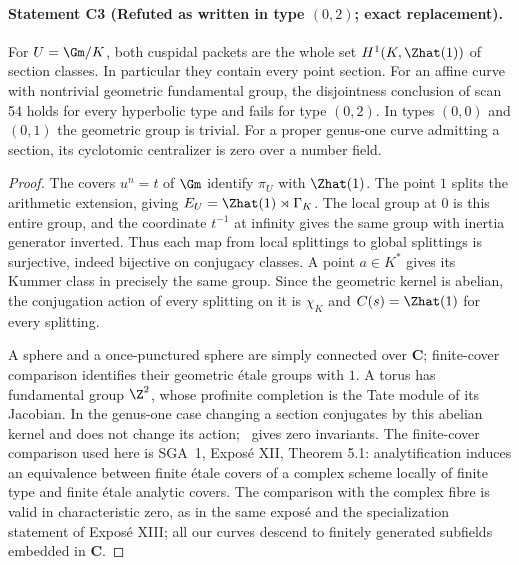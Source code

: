 \paragraph{Statement C3 (Refuted as written in type $(0,2)$; exact replacement).}\label{res:C3}
For $U=\Gm/K$, both cuspidal packets are the whole set
$H^1(K,\Zhat(1))$ of section classes. In particular they contain every point section. For an affine curve with nontrivial geometric fundamental group, the disjointness conclusion of scan 54 holds for every hyperbolic type and fails for type $(0,2)$. In types $(0,0)$ and $(0,1)$ the geometric group is trivial. For a proper genus-one curve admitting a section, its cyclotomic centralizer is zero over a number field.
\begin{proof}
The covers $u^n=t$ of $\Gm$ identify $\pi_U$ with $\Zhat(1)$. The point $1$ splits the arithmetic extension, giving $E_U=\Zhat(1)\rtimes\Gamma_K$. The local group at $0$ is this entire group, and the coordinate $t^{-1}$ at infinity gives the same group with inertia generator inverted. Thus each map from local splittings to global splittings is surjective, indeed bijective on conjugacy classes. A point $a\in K^*$ gives its Kummer class in precisely the same group. Since the geometric kernel is abelian, the conjugation action of every splitting on it is $\chi_K$ and $C(s)=\Zhat(1)$ for every splitting.

A sphere and a once-punctured sphere are simply connected over $\mathbf C$; finite-cover comparison identifies their geometric étale groups with $1$. A torus has fundamental group $\Z^2$, whose profinite completion is the Tate module of its Jacobian. In the genus-one case changing a section conjugates by this abelian kernel and does not change its action; \Arith\ gives zero invariants. The finite-cover comparison used here is SGA~1, Exposé XII, Theorem 5.1: analytification induces an equivalence between finite étale covers of a complex scheme locally of finite type and finite étale analytic covers. The comparison with the complex fibre is valid in characteristic zero, as in the same exposé and the specialization statement of Exposé XIII; all our curves descend to finitely generated subfields embedded in $\mathbf C$.
\end{proof}

